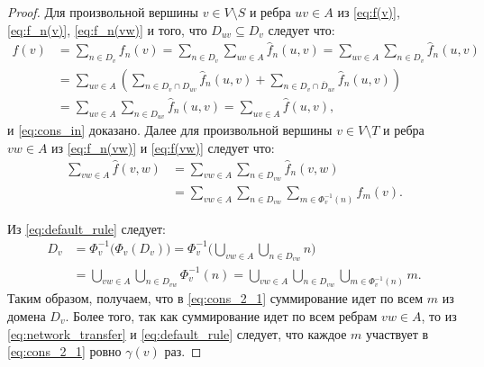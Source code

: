 \documentclass[../thesis.tex]{subfiles}
\begin{document}
\begin{proof}
Для произвольной вершины $v\in V\setminus S$ и ребра $uv\in A$ из \eqref{eq:f(v)}, \eqref{eq:f_n(v)}, \eqref{eq:f_n(vw)} и того, что $D_{uv}\subseteq D_v$ следует что:
\begin{equation} \label{eq:cons_1}
    \begin{split}
        f(v)
        & = \sum_{n\in D_v} {f_n(v)}
          = \sum_{n\in D_v} {\sum_{uv\in A}{\hat{f}_n(u,v)}}
          = \sum_{uv\in A} {\sum_{n\in D_v}{\hat{f}_n(u,v)}} \\
        & = \sum_{uv\in A}
            {
                \left(
                \sum_{n\in D_v\cap D_{uv}}{\hat{f}_n(u,v)}
                +
                \sum_{n\in D_v\cap \overline{D}_{uv}}{\hat{f}_n(u,v)}
                \right)
            } \\
        & = \sum_{uv\in A}{ \sum_{n\in D_{uv}}{\hat{f}_n(u,v)} }
          = \sum_{uv\in A}{\hat{f}(u,v)},
    \end{split}
\end{equation}
и \eqref{eq:cons_in} доказано.
Далее для произвольной вершины $v\in V\setminus T$ и ребра $vw\in A$ из \eqref{eq:f_n(vw)} и \eqref{eq:f(vw)} следует что:
\begin{equation} \label{eq:cons_2_1}
\begin{split}
    \sum_{vw\in A} {\hat{f}(v,w)}
    & = \sum_{vw\in A} {\sum_{n\in D_{vw}} {\hat{f}_n(v,w)}}\\
    & = \sum_{vw\in A} {
            \sum_{n\in D_{vw}} {
                \sum_{m\in \Phi^{-1}_v(n)} {f_m(v)}
            }
        }.
\end{split}
\end{equation}

Из \eqref{eq:default_rule} следует:
\begin{equation} \label{eq:cons_2_2}
    \begin{split}
        D_v
        & = \Phi^{-1}_v\big(\Phi_v(D_v)\big)
          = \Phi^{-1}_v
            \Big(
                \bigcup_{vw\in A} {
                    \bigcup_{n\in D_{vw}} {n}
                }
            \Big) \\
        & = \bigcup_{vw\in A} {
                \bigcup_{n\in D_{vw}} {\Phi^{-1}_v(n)}
            }
          = \bigcup_{vw\in A} {
                \bigcup_{n\in D_{vw}}
                {
                    \bigcup_{m\in \Phi^{-1}_v(n)} {m}
                }
            }.
    \end{split}
\end{equation}
Таким образом, получаем, что в \eqref{eq:cons_2_1} суммирование идет по всем $m$ из домена $D_v$. Более того, так как суммирование идет по всем ребрам $vw\in A$, то из \eqref{eq:network_transfer} и \eqref{eq:default_rule} следует, что каждое $m$ участвует в \eqref{eq:cons_2_1} ровно $\gamma(v)$ раз.


\end{proof}
\end{document}
